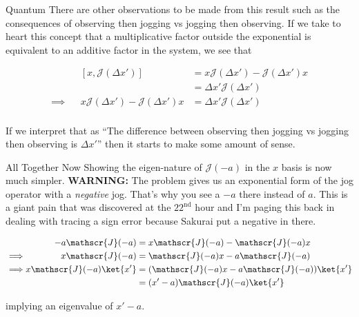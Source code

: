 \begin{answer}
\begin{answerpart}{Quantum}
    There are other observations to be made from this result such as
    the consequences of observing then jogging vs jogging then
    observing.  If we take to heart this concept that a multiplicative
    factor outside the exponential is equivalent to an additive factor
    in the system, we see that

    \begin{equation}
      \begin{alignedat}{2}
        &&[x, \mathscr{J}(\Delta x')]
        &= x\mathscr{J}(\Delta x') - \mathscr{J}(\Delta x')x\\
        &&&=
        \Delta x'
        \mathscr{J}(\Delta x')
        \\
        \implies
        && x\mathscr{J}(\Delta x') - \mathscr{J}(\Delta x')x
        &= 
        \Delta x'
        \mathscr{J}(\Delta x')
        \\
      \end{alignedat}
    \end{equation}

    If we interpret that as ``The difference between observing then
    jogging vs jogging then observing is $\Delta x'$'' then it starts
    to make some amount of sense.
  \end{answerpart}

  \begin{answerpart}{All Together Now}
    Showing the eigen-nature of $\mathscr{J}(-a)$ in the $x$ basis is
    now much simpler. \textbf{WARNING:} The problem gives us an
    exponential form of the jog operator with a \emph{negative} jog.
    That's why you see a $-a$ there instead of $a$.  This is a giant
    pain that was discovered at the $22^{\text{nd}}$ hour and I'm paging this
    back in dealing with tracing a sign error because Sakurai put a
    negative in there.

    \begin{equation}
      \begin{alignedat}{2}
        &&-a\mathscr{J}(-a)
        &= x\mathscr{J}(-a) - \mathscr{J}(-a)x
        \\
        \implies
        &&x\mathscr{J}(-a)
        &= \mathscr{J}(-a)x - a\mathscr{J}(-a)
        \\
        \implies
        &&x\mathscr{J}(-a)\ket{x'}
        &= (\mathscr{J}(-a)x - a\mathscr{J}(-a))\ket{x'}
        \\
        &&&= (x' - a)\mathscr{J}(-a)\ket{x'}
        \\
      \end{alignedat}
    \end{equation}

    implying an eigenvalue of $x' - a$.
  \end{answerpart}

\end{answer}
